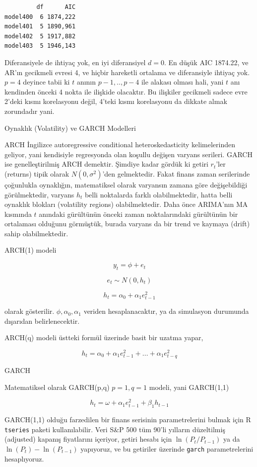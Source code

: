 \documentclass[12pt,fleqn]{article}\usepackage{../../common}
\begin{document}
\begin{verbatim}
         df      AIC
model400  6 1874,222
model401  5 1890,961
model402  5 1917,882
model403  5 1946,143

\end{verbatim}

Diferansiyele de ihtiyaç yok, en iyi diferansiyel $d=0$. En düşük AIC
1874.22, ve AR'ın gecikmeli evresi 4, ve hiçbir hareketli ortalama ve
diferansiyle ihtiyaç yok. $p=4$ deyince tabii ki $t$ anının $p-1,..,p-4$
ile alakası olması hali, yani $t$ anı kendinden önceki 4 nokta ile ilişkide
olacaktır. Bu ilişkiler gecikmeli sadece evre 2'deki kısmı korelasyonu
değil, 4'teki kısmı korelasyonu da dikkate almak zorundadır yani.

Oynaklık (Volatility) ve GARCH Modelleri

ARCH İngilizce autoregressive conditional heteroskedasticity kelimelerinden
geliyor, yani kendisiyle regresyonda olan koşullu değişen varyans
serileri. GARCH ise genelleştirilmiş ARCH demektir. Şimdiye kadar gördük ki
getiri $r_t$'ler (returns) tipik olarak $N(0,\sigma^2)$'den
gelmektedir. Fakat finans zaman serilerinde çoğunlukla oynaklığın,
matematiksel olarak varyansın zamana göre değişebildiği görülmektedir,
varyans $h_t$ belli noktalarda farklı olabilmektedir, hatta belli oynaklık
blokları (volatility regions) olabilmektedir. Daha önce ARIMA'nın MA
kısmında $t$ anındaki gürültünün önceki zaman noktalarındaki gürültünün bir
ortalaması olduğunu görmüştük, burada varyans da bir trend ve kaymaya
(drift) sahip olabilmektedir. 

ARCH(1) modeli

$$ y_t = \phi + e_t $$

$$ e_t \sim N(0,h_t) $$

$$ h_t = \alpha_0 + \alpha_1 e_{t-1}^2 $$

olarak gösterilir. $\phi,\alpha_0,\alpha_1$ veriden hesaplanacaktır, ya da
simulasyon durumunda dışarıdan belirlenecektir. 

ARCH(q) modeli üstteki formül üzerinde basit bir uzatma yapar,

$$ h_t = \alpha_0 + \alpha_1 e_{t-1}^2 + ... + \alpha_1 e_{t-q}^2 $$

GARCH

Matematiksel olarak GARCH(p,q) $p=1,q=1$ modeli, yani GARCH(1,1)

$$ h_t = \omega + \alpha_1 e_{t-1}^2 + \beta_1 h_{t-1}$$

GARCH(1,1) olduğu farzedilen bir finans serisinin parametrelerini bulmak
için R \verb!tseries! paketi kullanılabilir. Veri S\&P 500 tüm 90'li
yılların düzeltilmiş (adjusted) kapanış fiyatlarını içeriyor, getiri hesabı
için $\ln (P_t/P_{t-1})$ ya da $\ln (P_t) - \ln(P_{t-1})$ yapıyoruz, ve bu
getiriler üzerinde \verb!garch! parametrelerini hesaplıyoruz. 
\end{document}
